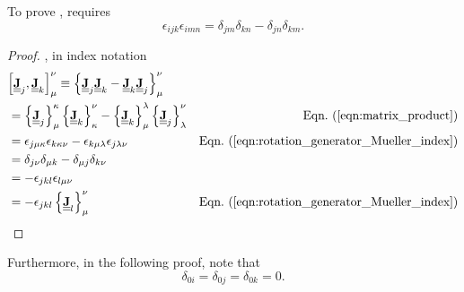 To prove , requires
$$ \epsilon_{ijk} \epsilon_{imn} = \delta_{jm}\delta_{kn} - \delta_{jn}\delta_{km}. $$

\begin{proof}
, in index notation
\begin{align*}
\left[\MM{J}_j, \MM{J}_k\right]_\irow^\icol 
    & \equiv \left\{ \MM{J}_j \MM{J}_k - \MM{J}_k \MM{J}_j \right\}_\irow^\icol \\
    & \hspace{-4em} = \left\{\MM{J}_j\right\}_\irow^\kappa \left\{\MM{J}_k\right\}_\kappa^\icol 
      - \left\{\MM{J}_k\right\}_\irow^\lambda \left\{\MM{J}_j\right\}_\lambda^\icol & \peqn{matrix_product} \\
    & \hspace{-4em} = \epsilon_{j\irow\kappa} \epsilon_{k\kappa\icol} -  \epsilon_{k\irow\lambda} \epsilon_{j\lambda\icol}
        & \peqn{rotation_generator_Mueller_index} \\
    & \hspace{-4em} = \delta_{j\icol}\delta_{\irow k} - \delta_{\irow j}\delta_{k\icol}  \\           
    & \hspace{-4em} = - \epsilon_{jkl}  \epsilon_{l \irow\icol}   \\           
   & \hspace{-4em} = - \epsilon_{jkl} \left\{ \MM{J}_l \right\}_\irow^\icol & \peqn{rotation_generator_Mueller_index}
\end{align*}
\end{proof}

Furthermore, in the following proof, note that $$\delta_{0i}=\delta_{0j}=\delta_{0k}=0.$$

